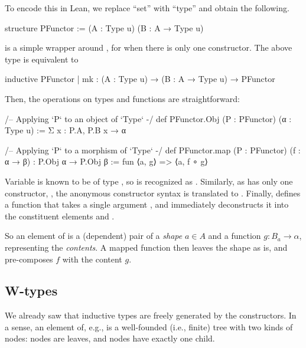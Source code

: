 To encode this in Lean, we replace ``set'' with ``type'' and obtain the following.
\begin{leancode}
    structure PFunctor := (A : Type u) (B : A → Type u)
\end{leancode}

\begin{remark}
     is a simple wrapper around \inductive{}, for when there is only one constructor.
    The above type is equivalent to
    \begin{leancode}
        inductive PFunctor 
        | mk : (A : Type u) → (B : A → Type u) → PFunctor
    \end{leancode}
\end{remark}

Then, the operations on types and functions are straightforward:
\begin{leancode}
    /-- Applying `P` to an object of `Type` -/
    def PFunctor.Obj (P : PFunctor) (α : Type u)
        := Σ x : P.A, P.B x → α

    /-- Applying `P` to a morphism of `Type` -/
    def PFunctor.map (P : PFunctor) (f : α → β) : P.Obj α → P.Obj β 
        := fun ⟨a, g⟩ => ⟨a, f ∘ g⟩
\end{leancode}

\begin{remark}
    Variable  is known to be of type , so  is recognized as . Similarly, as  has only one constructor, , the anonymous constructor syntax  is translated to .
    Finally,  defines a function that takes a single argument , and immediately deconstructs it into the constituent elements  and .
\end{remark}

So an element of  is a (dependent) pair of a \emph{shape} $a ∈ A$ and a function $g : B_a \rightarrow \alpha$, representing the \emph{contents}. A mapped function  then leaves the shape as is, and pre-composes $f$ with the content $g$.

\subsection*{W-types}
We already saw that inductive types are freely generated by the constructors. In a sense, an element of, e.g.,  is a well-founded (i.e., finite) tree with two kinds of nodes:  nodes are leaves, and  nodes have exactly one child.

